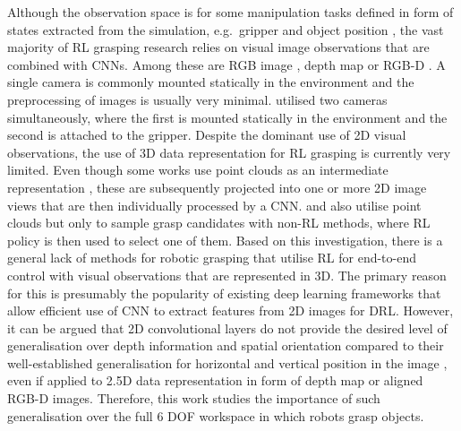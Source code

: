Although the observation space is for some manipulation tasks defined in form of states extracted from the simulation, e.g.~gripper and object position \cite{popov_data-efficient_2017, haarnoja_composable_2018}, the vast majority of RL grasping research relies on visual image observations that are combined with CNNs. Among these are RGB image \cite{tobin_domain_2017, kalashnikov_qt-opt_2018, quillen_deep_2018, kim_acceleration_2020, iqbal_toward_2020}, depth map \cite{gualtieri_learning_2018, breyer_comparing_2019, wu_generative_2020} or RGB-D \cite{zeng_learning_2018, liu_active_2019, daniel_deep_2020}. A single camera is commonly mounted statically in the environment and the preprocessing of images is usually very minimal. \citet{zhan_framework_2020, joshi_robotic_2020} utilised two cameras simultaneously, where the first is mounted statically in the environment and the second is attached to the gripper. Despite the dominant use of 2D visual observations, the use of 3D data representation for RL grasping is currently very limited. Even though some works use point clouds as an intermediate representation \cite{zeng_learning_2018, gualtieri_learning_2018}, these are subsequently projected into one or more 2D image views that are then individually processed by a CNN. \citet{osa_experiments_2017} and \citet{gualtieri_pick_2018} also utilise point clouds but only to sample grasp candidates with non-RL methods, where RL policy is then used to select one of them. Based on this investigation, there is a general lack of methods for robotic grasping that utilise RL for end-to-end control with visual observations that are represented in 3D. The primary reason for this is presumably the popularity of existing deep learning frameworks that allow efficient use of CNN to extract features from 2D images for DRL. However, it can be argued that 2D convolutional layers do not provide the desired level of generalisation over depth information and spatial orientation compared to their well-established generalisation for horizontal and vertical position in the image \cite{gualtieri_pick_2018}, even if applied to 2.5D data representation in form of depth map or aligned RGB-D images. Therefore, this work studies the importance of such generalisation over the full 6 DOF workspace in which robots grasp objects.

